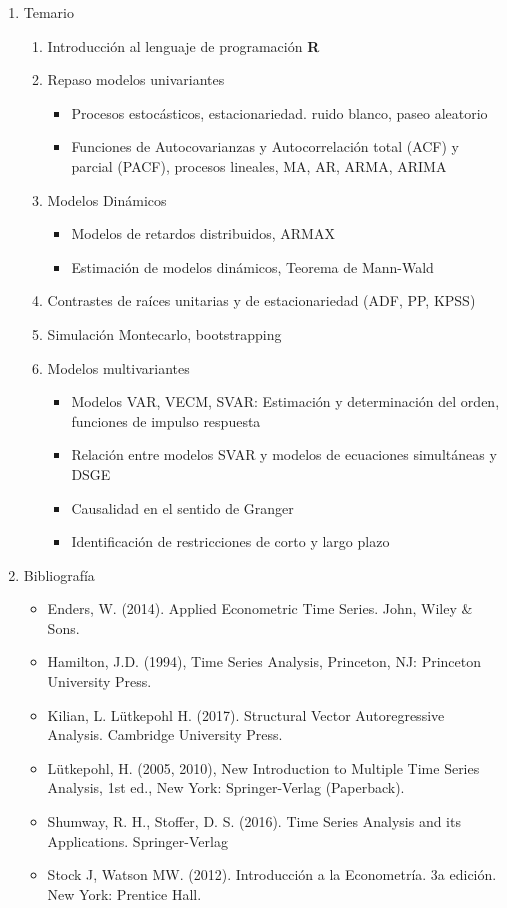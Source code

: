 \documentclass{article}\usepackage[]{graphicx}\usepackage[]{color}
\begin{document}
\begin{enumerate}
  \item Temario
    \begin{enumerate}
      \item Introducción al lenguaje de programación \textbf{\textsf{R}}
      \item Repaso modelos univariantes
        \begin{itemize}
          \item Procesos estocásticos, estacionariedad. ruido blanco, paseo aleatorio
          \item Funciones de Autocovarianzas y Autocorrelación total (ACF) y parcial (PACF), procesos lineales, MA, AR, ARMA, ARIMA
        \end{itemize}
      \item Modelos Dinámicos
        \begin{itemize}
          \item Modelos de retardos distribuidos, ARMAX
          \item Estimación de modelos dinámicos, Teorema de Mann-Wald
        \end{itemize}
      \item Contrastes de raíces unitarias y de estacionariedad (ADF, PP, KPSS)
      \item Simulación Montecarlo, bootstrapping
      \item Modelos multivariantes
        \begin{itemize}
          \item Modelos VAR, VECM, SVAR: Estimación y determinación del orden, funciones de impulso respuesta
          \item Relación entre modelos SVAR y modelos de ecuaciones simultáneas y DSGE
          \item Causalidad en el sentido de Granger
          \item Identificación de restricciones de corto y largo plazo
        \end{itemize}
  \end{enumerate}
  
  \item Bibliografía
  \begin{itemize}
    \item Enders, W. (2014). Applied Econometric Time Series. John, Wiley \& Sons.
    \item Hamilton, J.D. (1994), Time Series Analysis, Princeton, NJ: Princeton University Press.
    \item Kilian, L. Lütkepohl H. (2017). Structural Vector Autoregressive Analysis. Cambridge University Press.
    \item Lütkepohl, H. (2005, 2010), New Introduction to Multiple Time Series Analysis, 1st ed., New York: Springer-Verlag (Paperback).
    \item Shumway, R. H., Stoffer, D. S. (2016). Time Series Analysis and its Applications. Springer-Verlag
    \item Stock J, Watson MW. (2012). Introducción a la Econometría. 3a edición. New York: Prentice Hall. 
  \end{itemize}
\end{enumerate}
\end{document}
